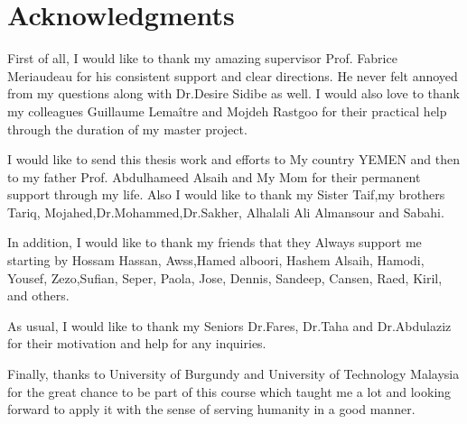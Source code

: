 \doublespacing

\setcounter{page}{1} \pagestyle{plain}


\tableofcontents

\listoffigures
\listoftables \clearpage
{}
\printacronyms[name = Abbreviations]

\chapter*{Acknowledgments}
         {\protect{}}

First of all, I would like to thank my amazing supervisor Prof. Fabrice Meriaudeau for his consistent support and clear directions.
He never felt annoyed from my questions along with Dr.Desire Sidibe as well.
I would also love to thank my colleagues Guillaume Lema\^{i}tre and Mojdeh Rastgoo for their practical help through the duration of my master project.

I would like to send this thesis work and efforts to My country YEMEN and then to my father Prof. Abdulhameed Alsaih and My Mom for their permanent support through my life.
Also I would like to thank my Sister Taif,my brothers Tariq, Mojahed,Dr.Mohammed,Dr.Sakher, Alhalali Ali Almansour and Sabahi.

In addition, I would like to thank my friends that they Always support me starting by Hossam Hassan, Awss,Hamed alboori, Hashem Alsaih, Hamodi, Yousef, Zezo,Sufian, Seper, Paola, Jose, Dennis, Sandeep, Cansen, Raed, Kiril, and others.

As usual, I would like to thank my Seniors Dr.Fares, Dr.Taha and Dr.Abdulaziz for their motivation and help for any inquiries.   

Finally, thanks to University of Burgundy and University of Technology Malaysia for the great chance to be part of this course which taught me a lot and looking forward to apply it with the sense of serving humanity in a good manner.

\pagestyle{fancy}


